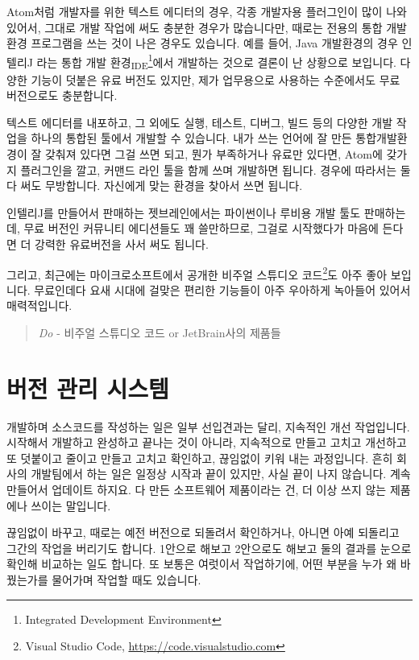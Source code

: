 \documentclass[11pt,a4paper]{article}
\newcommand{\sub}[1]{\textsubscript{#1}}
\begin{document}
Atom처럼 개발자를 위한 텍스트 에디터의 경우, 각종 개발자용 플러그인이 많이 나와있어서, 그대로 개발 작업에 써도 충분한 경우가 많습니다만, 때로는 전용의 통합 개발 환경 프로그램을 쓰는 것이 나은 경우도 있습니다. 예를 들어, Java 개발환경의 경우 인텔리J 라는 통합 개발 환경\sub{IDE}\footnote{Integrated Development Environment}에서 개발하는 것으로 결론이 난 상황으로 보입니다. 다양한 기능이 덧붙은 유료 버전도 있지만, 제가 업무용으로 사용하는 수준에서도 무료 버전으로도 충분합니다.

텍스트 에디터를 내포하고, 그 외에도 실행, 테스트, 디버그, 빌드 등의 다양한 개발 작업을 하나의 통합된 툴에서 개발할 수 있습니다. 내가 쓰는 언어에 잘 만든 통합개발환경이 잘 갖춰져 있다면 그걸 쓰면 되고, 뭔가 부족하거나 유료만 있다면, Atom에 갖가지 플러그인을 깔고, 커맨드 라인 툴을 함께 쓰며 개발하면 됩니다. 경우에 따라서는 둘 다 써도 무방합니다. 자신에게 맞는 환경을 찾아서 쓰면 됩니다.

인텔리J를 만들어서 판매하는 젯브레인에서는 파이썬이나 루비용 개발 툴도 판매하는데, 무료 버전인 커뮤니티 에디션들도 꽤 쓸만하므로, 그걸로 시작했다가 마음에 든다면 더 강력한 유료버전을 사서 써도 됩니다.

그리고, 최근에는 마이크로소프트에서 공개한 비주얼 스튜디오 코드\footnote{Visual Studio Code, \url{https://code.visualstudio.com}}도 아주 좋아 보입니다. 무료인데다 요새 시대에 걸맞은 편리한 기능들이 아주 우아하게 녹아들어 있어서 매력적입니다.

\begin{quote}
\emph{Do} - 비주얼 스튜디오 코드 or JetBrain사의 제품들
\end{quote}

\section{버전 관리 시스템}

개발하며 소스코드를 작성하는 일은 일부 선입견과는 달리, 지속적인 개선 작업입니다. 시작해서 개발하고 완성하고 끝나는 것이 아니라, 지속적으로 만들고 고치고 개선하고 또 덧붙이고 줄이고 만들고 고치고 확인하고, 끊임없이 키워 내는 과정입니다. 흔히 회사의 개발팀에서 하는 일은 일정상 시작과 끝이 있지만, 사실 끝이 나지 않습니다. 계속 만들어서 업데이트 하지요. 다 만든 소프트웨어 제품이라는 건, 더 이상 쓰지 않는 제품에나 쓰이는 말입니다.

끊임없이 바꾸고, 때로는 예전 버전으로 되돌려서 확인하거나, 아니면 아예 되돌리고 그간의 작업을 버리기도 합니다. 1안으로 해보고 2안으로도 해보고 둘의 결과를 눈으로 확인해 비교하는 일도 합니다. 또 보통은 여럿이서 작업하기에, 어떤 부분을 누가 왜 바꿨는가를 물어가며 작업할 때도 있습니다.
\end{document}
